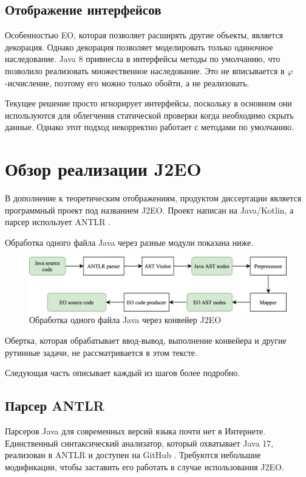 \documentclass[oneside,final,14pt,a4paper]{extreport}
\theoremstyle{definition}
\theoremstyle{remark}
\theoremstyle{remark}
\begin{document}
\subsection{Отображение интерфейсов}

Особенностью EO, которая позволяет расширять другие объекты, является декорация. Однако декорация позволяет моделировать только одиночное наследование. Java 8 привнесла в интерфейсы методы по умолчанию, что позволило реализовать множественное наследование. Это не вписывается в $\varphi$-исчисление, поэтому его можно только обойти, а не реализовать.

Текущее решение просто игнорирует интерфейсы, поскольку в основном они используются для облегчения статической проверки когда необходимо скрыть данные. Однако этот подход некорректно работает с методами по умолчанию.


\section{Обзор реализации J2EO}

В дополнение к теоретическим отображениям, продуктом диссертации является программный проект под названием J2EO. Проект написан на Java/Kotlin, а парсер использует ANTLR \cite{antlr_website}.

Обработка одного файла Java через разные модули показана ниже.

\begin{figure}[H]
  \includegraphics[width=1\textwidth]{j2eo_structure.png}
  \centering
  \caption{Обработка одного файла Java через конвейер J2EO}
  \label{fig:j2eo_flow}
\end{figure}

Обертка, которая обрабатывает ввод-вывод, выполнение конвейера и другие рутинные задачи, не рассматривается в этом тексте.

Следующая часть описывает каждый из шагов более подробно.

\subsection{Парсер ANTLR}
Парсеров Java для современных версий языка почти нет в Интернете. Единственный синтаксический анализатор, который охватывает Java 17, реализован в ANTLR и доступен на GitHub \cite{antlr_java_parser}. Требуются небольшие модификации, чтобы заставить его работать в случае использования J2EO.
\end{document}
